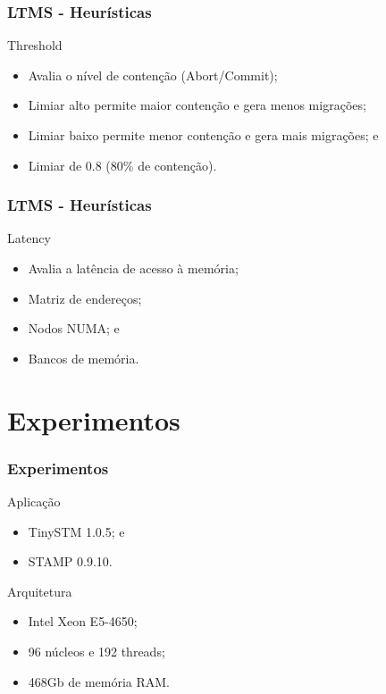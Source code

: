 \documentclass[10pt, pdf,xcolor=pdftex,dvipsnames,table]{beamer}
\begin{document}
\begin{frame} \frametitle{LTMS - Heurísticas}
    \begin{block}{Threshold}
        \begin{itemize}
        	\item Avalia o nível de contenção (Abort/Commit);
        	\item Limiar alto permite maior contenção e gera menos migrações;
        	\item Limiar baixo permite menor contenção e gera mais migrações; e
        	\item Limiar de 0.8 (80\% de contenção).
        \end{itemize}
    \end{block}
\end{frame}

\begin{frame} \frametitle{LTMS - Heurísticas}
    \begin{block}{Latency}
        \begin{itemize}
        	\item Avalia a latência de acesso à memória;
        	\item Matriz de endereços;
        	\item Nodos NUMA; e
        	\item Bancos de memória.
        \end{itemize}
    \end{block}
\end{frame}

\section{Experimentos}
\begin{frame} \frametitle{Experimentos}
    \begin{block}{Aplicação}
        \begin{itemize}
            \item TinySTM 1.0.5; e
            \item STAMP 0.9.10.
        \end{itemize}
    \end{block}
 
    \begin{block}{Arquitetura}
        \begin{itemize}
        	\item Intel Xeon E5-4650;
            \item 96 núcleos e 192 threads;
            \item 468Gb de memória RAM.
        \end{itemize}
    \end{block}
\end{frame}
\end{document}
